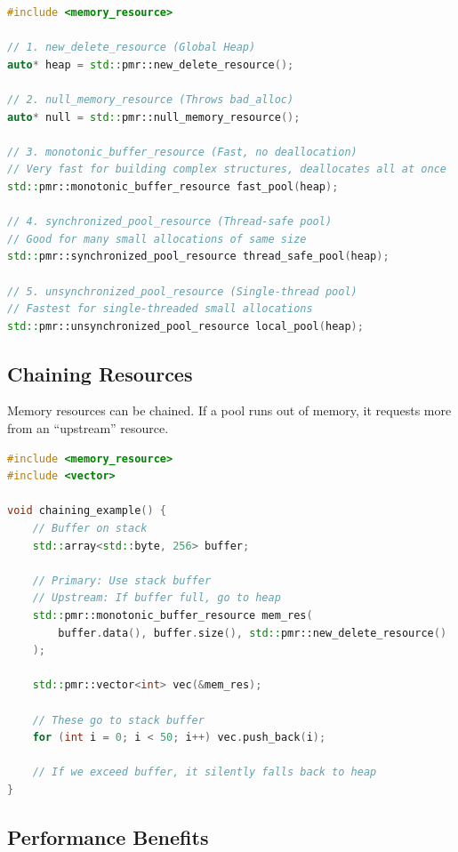 \begin{lstlisting}[language={C++}]
#include <memory_resource>

// 1. new_delete_resource (Global Heap)
auto* heap = std::pmr::new_delete_resource();

// 2. null_memory_resource (Throws bad_alloc)
auto* null = std::pmr::null_memory_resource();

// 3. monotonic_buffer_resource (Fast, no deallocation)
// Very fast for building complex structures, deallocates all at once
std::pmr::monotonic_buffer_resource fast_pool(heap);

// 4. synchronized_pool_resource (Thread-safe pool)
// Good for many small allocations of same size
std::pmr::synchronized_pool_resource thread_safe_pool(heap);

// 5. unsynchronized_pool_resource (Single-thread pool)
// Fastest for single-threaded small allocations
std::pmr::unsynchronized_pool_resource local_pool(heap);
\end{lstlisting}

\hypertarget{chaining-resources}{%
\subsection{Chaining Resources}\label{chaining-resources}}

Memory resources can be chained. If a pool runs out of memory, it
requests more from an ``upstream'' resource.

\begin{lstlisting}[language={C++}]
#include <memory_resource>
#include <vector>

void chaining_example() {
    // Buffer on stack
    std::array<std::byte, 256> buffer;
    
    // Primary: Use stack buffer
    // Upstream: If buffer full, go to heap
    std::pmr::monotonic_buffer_resource mem_res(
        buffer.data(), buffer.size(), std::pmr::new_delete_resource()
    );
    
    std::pmr::vector<int> vec(&mem_res);
    
    // These go to stack buffer
    for (int i = 0; i < 50; i++) vec.push_back(i);
    
    // If we exceed buffer, it silently falls back to heap
}
\end{lstlisting}

\hypertarget{performance-benefits}{%
\subsection{Performance Benefits}\label{performance-benefits}}

